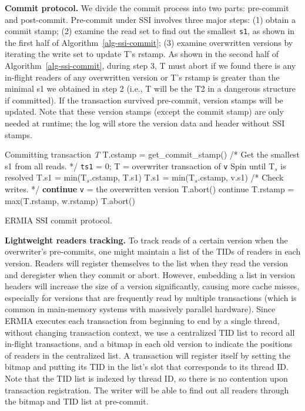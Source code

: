 {\bf Commit protocol.}
We divide the commit process into two parts: pre-commit and post-commit. Pre-commit under SSI involves three major steps: (1) obtain a commit stamp; (2) examine the read set to find out the smallest \texttt{s1}, as shown in the first half of Algorithm~\ref{alg-ssi-commit}; (3) examine overwritten versions by iterating the write set to update T's rstamp. As shown in the second half of Algorithm~\ref{alg-ssi-commit}, during step 3, T must abort if we found there is any in-flight readers of any overwritten version or T's rstamp is greater than the minimal s1 we obtained in step 2 (i.e., T will be the T2 in a dangerous structure if committed). If the transaction survived pre-commit, version stamps will be updated. Note that these version stamps (except the commit stamp) are only needed at runtime; the log will store the version data and header without SSI stamps.

\begin{algorithm}
\begin{algorithmic}[1]
 Committing transaction \textit{T}
\STATE T.cstamp = get\_commit\_stamp()
\STATE /* Get the smallest s1 from all reads. */
\STATE \texttt{ts1} = 0;
\STATE T = overwriter transaction of \texttt{v}
\STATE Spin until T$_s$ is resolved
\STATE T.s1 = min(T$_s$.cstamp, T.s1)
\ENDIF
\ELSE
\STATE T.s1 = min(T$_s$.cstamp, v.s1)
\ENDIF
\ENDFOR
\STATE
\STATE /* Check writes. */
\STATE \textbf{continue}
\ENDIF
\STATE \texttt{v} = the overwritten version
\STATE T.abort()
\ENDIF
{}
\STATE continue
\ENDIF
\STATE T.rstamp = max(T.rstamp, w.rstamp)
\STATE T.abort()
\ENDIF
\ENDFOR
\ENDFOR
\end{algorithmic}
\label{alg-ssi-commit}
\caption{ERMIA SSI commit protocol.}
\end{algorithm}

{\bf Lightweight readers tracking.}
To track reads of a certain version when the overwriter's pre-commits, one might maintain a list of the TIDs of readers in each version. Readers will register themselves to the list when they read the version and deregister when they commit or abort. However, embedding a list in version headers will increase the size of a version significantly, causing more cache misses, especially for versions that are frequently read by multiple transactions (which is common in main-memory systems with massively parallel hardware). Since ERMIA executes each transaction from beginning to end by a single thread, without changing transaction context, we use a centralized TID list to record all in-flight transactions, and a bitmap in each old version to indicate the positions of readers in the centralized list. A transaction will register itself by setting the bitmap and putting its TID in the list's slot that corresponds to its thread ID. Note that the TID list is indexed by thread ID, so there is no contention upon transaction registration. The writer will be able to find out all readers through the bitmap and TID list at pre-commit.


